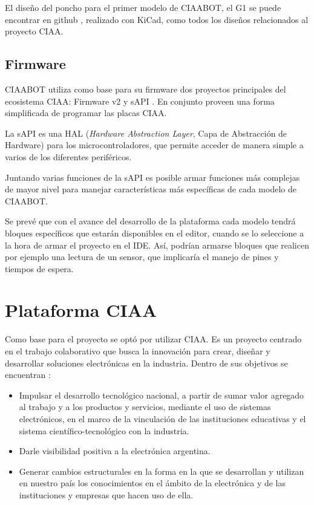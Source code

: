 El diseño del poncho para el primer modelo de CIAABOT, el G1 se puede encontrar en github \citep{CIAABOT:G1}, realizado con KiCad, como todos los diseños relacionados al proyecto CIAA.

\subsection{Firmware}
\label{subsec:firmware}
CIAABOT utiliza como base para su firmware dos proyectos principales del ecosistema CIAA: Firmware v2 \citep{CIAA:firmwarev2} y sAPI \citep{sAPI}. En conjunto proveen una forma simplificada de programar las placas CIAA.

La sAPI es una HAL (\emph{Hardware Abstraction Layer}, Capa de Abstracción de Hardware) para los microcontroladores, que permite acceder de manera simple a varios de los diferentes periféricos.

Juntando varias funciones de la sAPI es posible armar funciones más complejas de mayor nivel para manejar características más específicas de cada modelo de CIAABOT.

Se prevé que con el avance del desarrollo de la plataforma cada modelo tendrá bloques específicos que estarán disponibles en el editor, cuando se lo seleccione a la hora de armar el proyecto en el IDE. Así, podrían armarse bloques que realicen por ejemplo una lectura de un sensor, que implicaría el manejo de pines y tiempos de espera.

\section{Plataforma CIAA}
\label{sec:plataforma}
Como base para el proyecto se optó por utilizar CIAA. Es un proyecto centrado en el trabajo colaborativo que busca la innovación para crear, diseñar y desarrollar soluciones electrónicas en la industria. Dentro de sus objetivos se encuentran \citep{CIAA:wiki}:

\begin{itemize}
\item Impulsar el desarrollo tecnológico nacional, a partir de sumar valor agregado al trabajo y a los productos y servicios, mediante el uso de sistemas electrónicos, en el marco de la vinculación de las instituciones educativas y el sistema científico-tecnológico con la industria.

\item Darle visibilidad positiva a la electrónica argentina.

\item Generar cambios estructurales en la forma en la que se desarrollan y utilizan en nuestro país los conocimientos en el ámbito de la electrónica y de las instituciones y empresas que hacen uso de ella.
\end{itemize}

